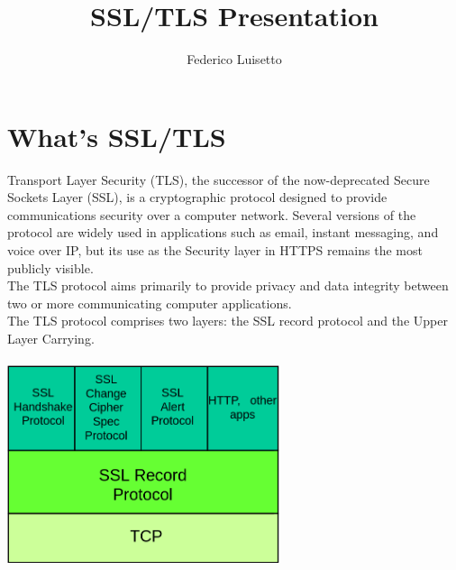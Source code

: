 \documentclass{article}
\title{SSL/TLS Presentation}
\author{Federico Luisetto}
\begin{document}
\maketitle

\section{What's SSL/TLS}
Transport Layer Security (TLS), the successor of the now-deprecated Secure Sockets Layer (SSL), is a cryptographic 
protocol designed to provide communications security over a computer network. Several versions of the protocol are widely 
used in applications such as email, instant messaging, and voice over IP, but its use as the Security layer in HTTPS remains the most publicly visible.
\\The TLS protocol aims primarily to provide privacy and data integrity between two or more communicating computer applications.
\\The TLS protocol comprises two layers: the SSL record protocol and the Upper Layer Carrying.\\\\

\includegraphics[width=8cm]{SSL_TLS.png}

\end{document}
